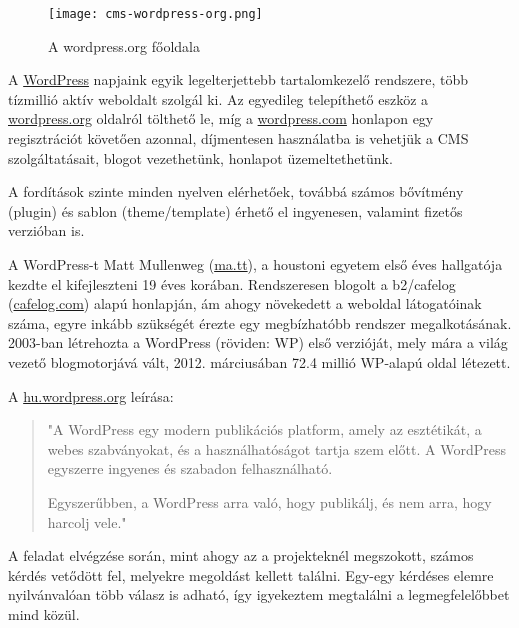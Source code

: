 \newpage


\begin{figure}
	\texttt{[image: cms-wordpress-org.png]}
	\caption{A wordpress.org főoldala}
\end{figure}

A \href{https://wordpress.org/}{WordPress} napjaink egyik legelterjettebb tartalomkezelő rendszere, több tízmillió aktív weboldalt szolgál ki. Az egyedileg telepíthető eszköz a \href{https://wordpress.org/}{wordpress.org} oldalról tölthető le, míg a \href{https://wordpress.com/}{wordpress.com} honlapon egy regisztrációt követően azonnal, díjmentesen használatba is vehetjük a CMS szolgáltatásait, blogot vezethetünk, honlapot üzemeltethetünk.

A fordítások szinte minden nyelven elérhetőek, továbbá számos bővítmény (plugin) és sablon (theme/template) érhető el ingyenesen, valamint fizetős verzióban is.

A WordPress-t Matt Mullenweg (\href{http://ma.tt/}{ma.tt}), a houstoni egyetem első éves hallgatója kezdte el kifejleszteni 19 éves korában. Rendszeresen blogolt a b2/cafelog (\href{http://cafelog.com/}{cafelog.com}) alapú honlapján, ám ahogy növekedett a weboldal látogatóinak száma, egyre inkább szükségét érezte egy megbízhatóbb rendszer megalkotásának. 2003-ban létrehozta a WordPress (röviden: WP) első verzióját, mely mára a világ vezető blogmotorjává vált, 2012. márciusában 72.4 millió WP-alapú oldal létezett.

A \href{https://hu.wordpress.org/}{hu.wordpress.org} leírása:

\begin{quote}
"A WordPress egy modern publikációs platform, amely az esztétikát, a webes szabványokat, és a használhatóságot tartja szem előtt. A WordPress egyszerre ingyenes és szabadon felhasználható.

Egyszerűbben, a WordPress arra való, hogy publikálj, és nem arra, hogy harcolj vele."
\end{quote}

\newpage

\label{Chap:problemak}

A feladat elvégzése során, mint ahogy az a projekteknél megszokott, számos kérdés vetődött fel, melyekre megoldást kellett találni. Egy-egy kérdéses elemre nyilvánvalóan több válasz is adható, így igyekeztem megtalálni a legmegfelelőbbet mind közül.

